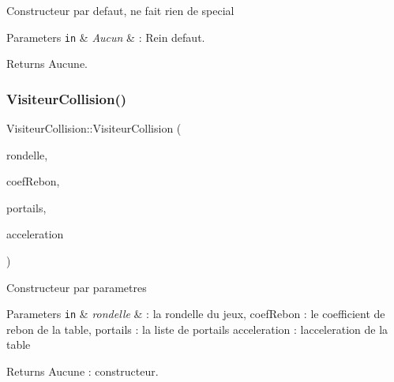 Constructeur par defaut, ne fait rien de special


\begin{DoxyParams}[1]{Parameters}
\mbox{\tt in}  & {\em Aucun} & \+: Rein defaut.\\
\hline
\end{DoxyParams}
\begin{DoxyReturn}{Returns}
Aucune. 
\end{DoxyReturn}
\hypertarget{class_visiteur_collision_a9383225a11bc84f3d5f3230b38df0d1f}{}\label{class_visiteur_collision_a9383225a11bc84f3d5f3230b38df0d1f} 
\subsubsection{\texorpdfstring{Visiteur\+Collision()}{VisiteurCollision()}\hspace{0.1cm}{\footnotesize\ttfamily [2/2]}}
{\footnotesize\ttfamily Visiteur\+Collision\+::\+Visiteur\+Collision (\begin{DoxyParamCaption}\item[{\hyperlink{class_noeud_rondelle}{Noeud\+Rondelle} $\ast$}]{rondelle,  }\item[{double}]{coef\+Rebon,  }\item[{std\+::vector$<$ \hyperlink{class_noeud_portail}{Noeud\+Portail} $\ast$$>$}]{portails,  }\item[{double}]{acceleration }\end{DoxyParamCaption})}

Constructeur par parametres


\begin{DoxyParams}[1]{Parameters}
\mbox{\tt in}  & {\em rondelle} & \+: la rondelle du jeux, coef\+Rebon \+: le coefficient de rebon de la table, portails \+: la liste de portails acceleration \+: l\textquotesingle{}acceleration de la table\\
\hline
\end{DoxyParams}
\begin{DoxyReturn}{Returns}
Aucune \+: constructeur. 
\end{DoxyReturn}
\hypertarget{class_visiteur_collision_a92543e88d42df4f030c7e98737628d9a}{}\label{class_visiteur_collision_a92543e88d42df4f030c7e98737628d9a} 

